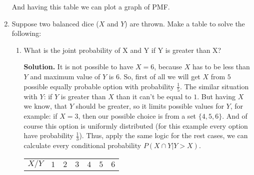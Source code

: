 \documentclass[a4paper, 12pt]{article}
\newcommand{\task}[2]{
    \item #1

    \textbf{Solution. } #2
}
\begin{document}
\begin{enumerate}
{              And having this table we can plot a graph of PMF.
              \begin{center}
              \end{center}
          }
    \item Suppose two balanced dice ($X$ and $Y$) are thrown. Make a table to solve the following:
          \begin{enumerate}
              \task{What is the joint probability of X and Y if Y is greater than X?}
              {
                  It is not possible to have $X=6$, because $X$ has to be less than $Y$ and maximum value of $Y$ is $6$.
                  So, first of all we will get $X$ from $5$ possible equally probable option with probability $\frac{1}{5}$.
                  The similar situation with $Y$: if $Y$ is greater than $X$ than it can't be equal
                  to $1$. But having $X$ we know, that $Y$ should be greater, so
                  it limits possible values for $Y$, for example: if $X=3$, then our possible choice is from a set
                  $\{4, 5, 6\}$. And of course this option is uniformly distributed (for this example
                  every option have probability $\frac{1}{3}$). Thus, apply the same logic for the rest cases,
                  we can calculate every conditional probability $P(X \cap Y | Y > X)$.
                  \begin{center}
                      \begin{tabular}{|c|c|c|c|c|c|c|}
                          \hline
                          $X / Y$ & $1$ & $2$                               & $3$                               & $4$                               & $5$                               & $6$                               \\

\end{tabular}
\end{center}}
\end{enumerate}
\end{enumerate}
\end{document}
